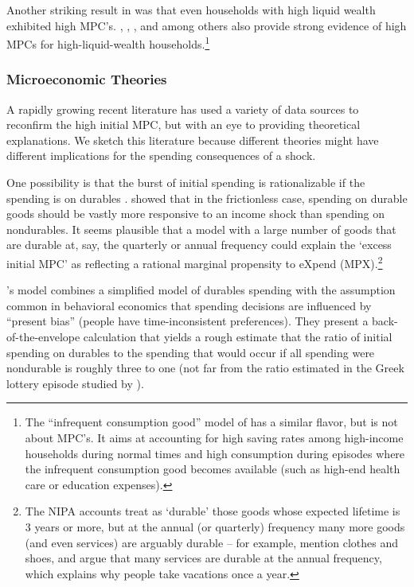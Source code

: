 \documentclass[\econtexRoot/HAFiscal]{subfiles}
\begin{document}
Another striking result in \cite{fagereng_mpc_2021} was that even households with high liquid wealth exhibited high MPC's.  \cite{boehm2025fivefacts}, \cite{graham2024mental}, \cite{crawley2023MicroMacro}, and \cite{kueng2018excess} among others also provide strong evidence of high MPCs for high-liquid-wealth households.\footnote{The ``infrequent consumption good'' model of \cite{melcangiStock} has a similar flavor, but is not about MPC's.  It aims at accounting for high saving rates among high-income households during normal times and high consumption during episodes where the infrequent consumption good becomes available (such as high-end health care or education expenses).}

\hypertarget{microeconomic-theories}{}
\subsubsection{Microeconomic Theories}
A rapidly growing recent literature has used a variety of data sources to reconfirm the high initial MPC, but with an eye to providing theoretical explanations. We sketch this literature because different theories might have different implications for the spending consequences of a shock.


One possibility is that the burst of initial spending is rationalizable if the spending is on durables \citep{bcShocksStocks}.  
\cite{mankiw:durgoods} showed that in the frictionless case, spending on durable goods should be vastly more responsive to an income shock than spending on nondurables. 
It seems plausible that a model with a large number of goods that are durable at, say, the quarterly or annual frequency could explain the `excess initial MPC' as reflecting a rational marginal propensity to eXpend (MPX).\footnote{The NIPA accounts treat as `durable' those goods whose expected lifetime is 3 years or more, but at the annual (or quarterly) frequency many more goods (and even services) are arguably durable -- for example, \cite{bdTimeSeriesC} mention clothes and shoes, and \cite{hkpMemorable} argue that many services are durable at the annual frequency, which explains why people take vacations once a year.}

\cite{lmmPresentBias}'s model combines a simplified model of durables spending with the assumption common in behavioral economics that spending decisions are influenced by ``present bias'' (people have time-inconsistent preferences).  They present a back-of-the-envelope calculation that yields a rough estimate that the ratio of initial spending on durables to the spending that would occur if all spending were nondurable is roughly three to one (not far from the ratio estimated in the Greek lottery episode studied by \cite{kotsogiannisMPCs}).
\end{document}
